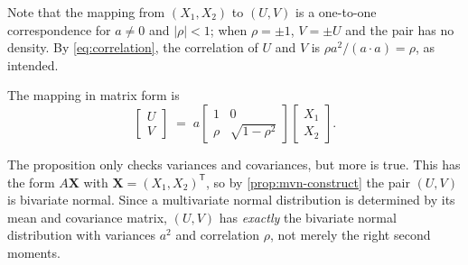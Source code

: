 Note that the mapping from $(X_{1},X_{2})$ to $(U,V)$ is a one-to-one correspondence for $a\neq 0$ and $|\rho|<1$; when $\rho=\pm1$, $V=\pm U$ and the pair has no density.
\suppstart
By \eqref{eq:correlation}, the correlation of $U$ and $V$ is $\rho a^{2}/(a\cdot a)=\rho$, as intended.
\suppend


The mapping in matrix form is
\begin{equation}
	\begin{bmatrix} U \\ V \end{bmatrix}
	\;=\; a\begin{bmatrix}
		1    & 0                  \\
		\rho & \sqrt{1-\rho^{2}}
	\end{bmatrix}
	\begin{bmatrix} X_{1} \\ X_{2} \end{bmatrix} . \label{eq:bivariate-matrix}
\end{equation}

\suppstart
The proposition only checks variances and covariances, but more is true.
This has the form $A\bm{X}$ with $\bm{X}=(X_{1},X_{2})^{\mathsf{T}}$, so by \autoref{prop:mvn-construct} the pair $(U,V)$ is bivariate normal.
Since a multivariate normal distribution is determined by its mean and covariance matrix, $(U,V)$ has \emph{exactly} the bivariate normal distribution with variances $a^{2}$ and correlation $\rho$, not merely the right second moments.

